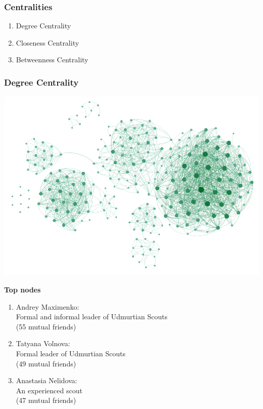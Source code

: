 \documentclass{beamer}
\begin{document}
\begin{frame}
\frametitle{Centralities}
\begin{enumerate}
\item Degree Centrality
\item Closeness Centrality
\item Betweenness Centrality
\end{enumerate}

\end{frame}


\begin{frame}
\frametitle{Degree Centrality}
\begin{multicols}{2}
	\includegraphics[width=\columnwidth]{Degree_centr.png}
	\columnbreak
	
	\textbf{Top nodes}
	\begin{enumerate}
	\item Andrey Maximenko:\\Formal and informal leader of Udmurtian Scouts\\(55 mutual friends)
	\item Tatyana Volnova:\\Formal leader of Udmurtian Scouts\\(49 mutual friends)
	\item Anastasia Nelidova:\\An experienced scout\\(47 mutual friends)
	\end{enumerate}
\end{multicols}

\end{frame}
\end{document}
